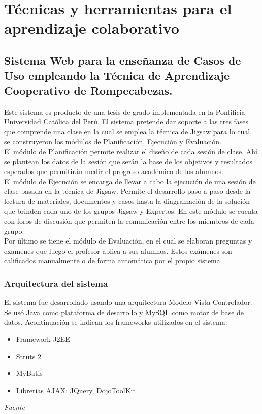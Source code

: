 \section{Técnicas y herramientas para el aprendizaje colaborativo}

\subsection{Sistema Web para la enseñanza de Casos
de Uso empleando la Técnica de Aprendizaje Cooperativo
de Rompecabezas.}

Este sistema es producto de una tesis de grado implementada en la Pontificia Universidad Católica del Perú. El sistema pretende dar soporte a las tres fases que comprende una clase en la cual se emplea la técnica de Jigsaw para lo cual, se construyeron los módulos de Planificación, Ejecución y Evaluación.\\

El módulo de Planificación permite realizar el diseño de cada sesión de clase. Ahí se plantean los datos de la sesión que serán la base de los objetivos y resultados esperados que permitirán medir el progreso académico de los alumnos.\\

El módulo de Ejecución se encarga de llevar a cabo la ejecución de una sesión de clase basada en la técnica de Jigsaw. Permite el desarrollo paso a paso desde la lectura de materiales, documentos y casos hasta la diagramación de la solución que brinden cada uno de los grupos Jigsaw y Expertos. En este módulo se cuenta con foros de discusión que permiten la comunicación entre los miembros de cada grupo.\\

Por último se tiene el módulo de Evaluación, en el cual se elaboran preguntas y examenes que luego el profesor aplica a sus alumnos. Estos exámenes son calificados manualmente o de forma automática por el propio sistema.

\subsubsection{Arquitectura del sistema}
El sistema fue desarrollado usando una arquitectura Modelo-Vista-Controlador. Se usó Java como plataforma de desarrollo y MySQL como motor de base de datos. Acontinuación se indican los frameworks utilizados en el sistema:

\begin{itemize}
  \item Framework J2EE
  \item Struts 2
  \item MyBatis
  \item Librerías AJAX: JQuery, DojoToolKit
\end{itemize}
\emph{Fuente} \cite{pinzas_desarrollo_2013}


